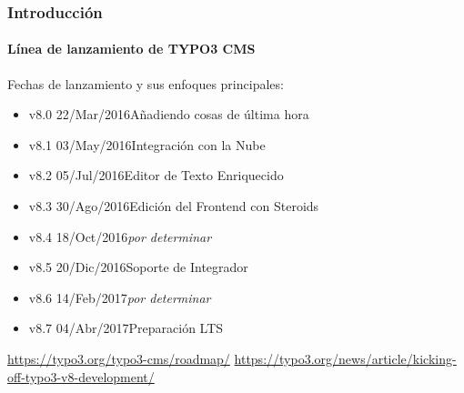 \begin{frame}[fragile]
	\frametitle{Introducción}
	\framesubtitle{Línea de lanzamiento de TYPO3 CMS}

	Fechas de lanzamiento y sus enfoques principales:

	\begin{itemize}

		\item
			\begingroup
				\color{typo3orange}
					v8.0 \tabto{1.1cm}22/Mar/2016\tabto{3.4cm}Añadiendo cosas de última hora
			\endgroup
		\item v8.1 \tabto{1.1cm}03/May/2016\tabto{3.4cm}Integración con la Nube
		\item v8.2 \tabto{1.1cm}05/Jul/2016\tabto{3.4cm}Editor de Texto Enriquecido
		\item v8.3 \tabto{1.1cm}30/Ago/2016\tabto{3.4cm}Edición del Frontend con Steroids
		\item v8.4 \tabto{1.1cm}18/Oct/2016\tabto{3.4cm}\textit{por determinar}
		\item v8.5 \tabto{1.1cm}20/Dic/2016\tabto{3.4cm}Soporte de Integrador
		\item v8.6 \tabto{1.1cm}14/Feb/2017\tabto{3.4cm}\textit{por determinar}
		\item v8.7 \tabto{1.1cm}04/Abr/2017\tabto{3.4cm}Preparación LTS

	\end{itemize}

	\smaller
		\url{https://typo3.org/typo3-cms/roadmap/}\newline
		\url{https://typo3.org/news/article/kicking-off-typo3-v8-development/}
	\normalsize

\end{frame}

